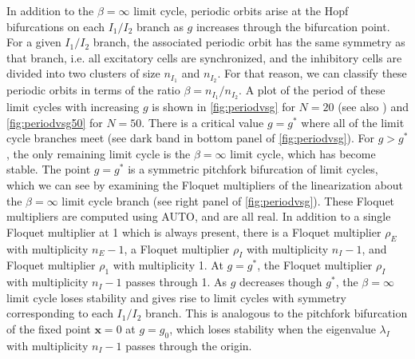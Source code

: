 \documentclass[reqno]{siamonline190516}
\newcommand{\xvec}{\mathbf{x}}
\begin{document}
In addition to the $\beta = \infty$ limit cycle, periodic orbits arise at the Hopf bifurcations on each $I_1/I_2$ branch as $g$ increases through the bifurcation point. For a given $I_1/I_2$ branch, the associated periodic orbit has the same symmetry as that branch, i.e. all excitatory cells are synchronized, and the inhibitory cells are divided into two clusters of size $n_{I_1}$ and $n_{I_2}$. For that reason, we can classify these periodic orbits in terms of the ratio $\beta = n_{I_1}/n_{I_2}$. A plot of the period of these limit cycles with increasing $g$ is shown in \cref{fig:periodvsg} for $N=20$ (see also \cite[Fig. 2]{Barreiro2017}) and \cref{fig:periodvsg50} for $N=50$. There is a critical value $g = g^*$ where all of the limit cycle branches meet (see dark band in bottom panel of \cref{fig:periodvsg}). For $g > g^*$, the only remaining limit cycle is the $\beta = \infty$ limit cycle, which has become stable. The point $g = g^*$ is a symmetric pitchfork bifurcation of limit cycles, which we can see by examining the Floquet multipliers of the linearization about the $\beta = \infty$ limit cycle branch (see right panel of \cref{fig:periodvsg}). These Floquet multipliers are computed using AUTO, and are all real. In addition to a single Floquet multiplier at 1 which is always present, there is a Floquet multiplier $\rho_E$ with multiplicity $n_E - 1$, a Floquet multiplier $\rho_I$ with multiplicity $n_I - 1$, and Floquet multiplier $\rho_1$ with multiplicity 1. At $g = g^*$, the Floquet multiplier $\rho_I$ with multiplicity $n_I - 1$ passes through 1. As $g$ decreases though $g^*$, the $\beta = \infty$ limit cycle loses stability and gives rise to limit cycles with symmetry corresponding to each $I_1/I_2$ branch. This is analogous to the pitchfork bifurcation of the fixed point $\xvec = 0$ at $g = g_0$, which loses stability when the eigenvalue $\lambda_I$ with multiplicity $n_I - 1$ passes through the origin.
\end{document}
